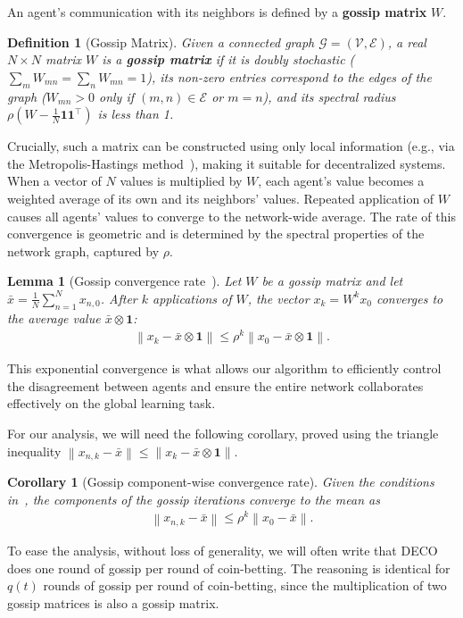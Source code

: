 \documentclass[journal]{IEEEtran} %
\newtheorem{definition}{Definition}
\newtheorem{lemma}{Lemma}
\newtheorem{corollary}{Corollary}
\newcommand{\norm}[1]{\left\lVert{#1}\right\rVert}
\newcommand{\algname}{{DECO}\xspace}
\begin{document}
An agent's communication with its neighbors is defined by a \textbf{gossip matrix} $W$.
\begin{definition}[Gossip Matrix]\label{def:gossip_matrix}
    Given a connected graph $\mathcal{G} = (\mathcal{V}, \mathcal{E})$, a real $N\times N$ matrix $W$ is a \textbf{gossip matrix} if it is doubly stochastic ($\sum_m W_{mn} = \sum_n W_{mn} = 1$), its non-zero entries correspond to the edges of the graph ($W_{mn}>0$ only if $(m,n) \in \mathcal{E}$ or $m=n$), and its spectral radius $\rho(W - \frac{1}{N} \mathbf {1} \mathbf{1}^\top)$ is less than 1.
\end{definition}
Crucially, such a matrix can be constructed using only local information (e.g., via the Metropolis-Hastings method~\cite{boyd_randomized_2006}), making it suitable for decentralized systems.
When a vector of $N$ values is multiplied by $W$, each agent's value becomes a weighted average of its own and its neighbors' values.
Repeated application of $W$ causes all agents' values to converge to the network-wide average.
The rate of this convergence is geometric and is determined by the spectral properties of the network graph, captured by $\rho$.
\begin{lemma}[Gossip convergence rate~\cite{boyd_randomized_2006}]\label{lemma:gossip}
    Let $W$ be a gossip matrix and let $\bar{x} = \frac{1}{N} \sum_{n=1}^N x_{n,0}$.
    After $k$ applications of $W$, the vector $x_k = W^k x_0$ converges to the average value $\bar{x} \otimes \mathbf{1}$:
    \begin{align}
        \norm{x_{k} - \bar{x} \otimes \mathbf{1}} \leq \rho^k \norm{x_0 - \bar{x} \otimes \mathbf{1}}.
    \end{align}
\end{lemma}
This exponential convergence is what allows our algorithm to efficiently control the disagreement between agents and ensure the entire network collaborates effectively on the global learning task.

For our analysis, we will need the following corollary, proved using the triangle inequality $\norm{x_{n,k} - \bar{x}} \leq  \norm{x_{k} - \bar{x} \otimes \mathbf{1}}$.
\begin{corollary}[Gossip component-wise convergence rate]\label{cor:gossip-components}
    Given the conditions in~, the components of the gossip iterations converge to the mean as
    \begin{align}
        \norm{x_{n,k} - \bar{x}}\leq \rho^k \norm{x_0 - \bar x}.
    \end{align}
\end{corollary}
To ease the analysis, without loss of generality, we will often write that \algname{} does one round of gossip per round of coin-betting.
The reasoning is identical for $q(t)$ rounds of gossip per round of coin-betting, since the multiplication of two gossip matrices is also a gossip matrix.
\end{document}
